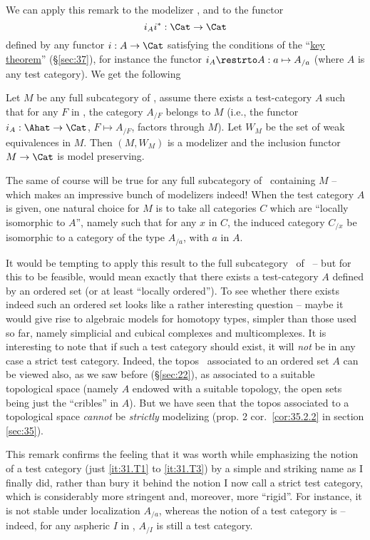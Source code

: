 We can apply this remark to the modelizer \Cat, and to the functor
\[ i_Ai^*:\Cat\to\Cat\]
defined by any functor $i:A\to\Cat$ satisfying the conditions of the
``\hyperref[thm:keyresult]{key theorem}'' (\S \ref{sec:37}), for instance the functor $i_A\restrto A: a
\mapsto A_{/a}$ (where $A$ is any test category). We get the following

\begin{proposition}
  Let $M$ be any full subcategory of \Cat, assume there exists a
  test-category $A$ such that for any $F$ in \Ahat, the category
  $A_{/F}$ belongs to $M$ \textup(i.e., the functor $i_A:\Ahat\to\Cat$,
  $F\mapsto A_{/F}$, factors through $M$\textup). Let $W_M$ be the set
  of weak equivalences in $M$. Then $(M,W_M)$ is a modelizer and the
  inclusion functor $M\to\Cat$ is model preserving.
\end{proposition}

The same of course will be true for any full subcategory of \Cat\
containing $M$ -- which makes an impressive bunch of modelizers
indeed! When the test category $A$ is given, one natural choice for
$M$ is to take all categories $C$ which are ``locally isomorphic to
$A$'', namely such that for any $x$ in $C$, the induced category
$C_{/x}$ be isomorphic to a category of the type $A_{/a}$, with $a$ in
$A$.

It would be tempting to apply this result to the full subcategory
\Ord\ of \Cat\ -- but for this to be feasible, would mean exactly that
there exists a test-category $A$ defined by an ordered set (or at
least ``locally ordered''). To see whether there exists indeed such an
ordered set looks like a rather interesting question -- maybe it would
give rise to algebraic models for homotopy types, simpler than those
used so far, namely simplicial and cubical complexes and
multicomplexes. It is interesting to note that if such a test category
should exist, it will \emph{not} be in any case a strict test
category. Indeed, the topos \Ahat\ associated to an ordered set $A$
can be viewed also, as we saw before (\S \ref{sec:22}), as
associated to a suitable topological space (namely $A$ endowed with a
suitable topology, the open sets being just the ``cribles'' in
$A$). But we have seen that the topos associated to a topological
space \emph{cannot} be \emph{strictly} modelizing (prop. 2 cor.\
\ref{cor:35.2.2} in section \ref{sec:35}).

This remark confirms the feeling that it was worth while emphasizing
the notion of a test category (just \ref{it:31.T1} to \ref{it:31.T3})
by a simple and striking name as I finally did, rather than bury it
behind the notion I now call a strict test category, which is
considerably more stringent and, moreover, more ``rigid''. For
instance, it is not stable under localization $A_{/a}$, whereas the
notion of a test category is -- indeed, for any aspheric $I$ in \Ahat,
$A_{/I}$ is still a test category.\pspage{75}

